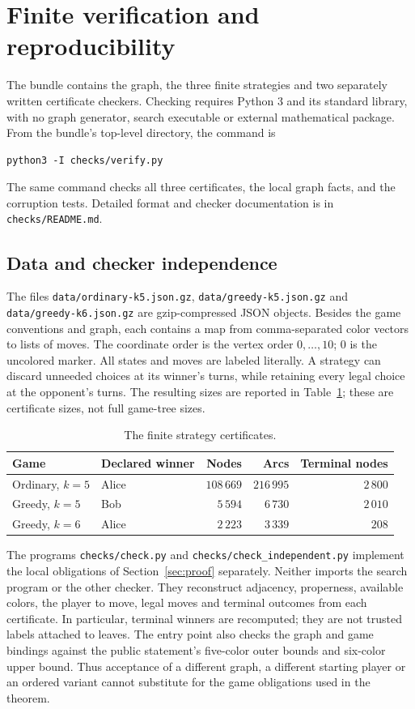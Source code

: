 \documentclass[11pt]{article}
\begin{document}
\section{Finite verification and reproducibility}\label{sec:checking}
The bundle contains the graph, the three finite strategies and two
separately written certificate checkers. Checking requires Python 3
and its standard library, with no graph generator, search executable
or external mathematical package. From the bundle's top-level directory,
the command is
\begin{verbatim}
python3 -I checks/verify.py
\end{verbatim}
The same command checks all three certificates, the local graph facts,
and the corruption tests. Detailed format and checker documentation is in
\texttt{checks/README.md}.

\subsection{Data and checker independence}
The files \texttt{data/ordinary-k5.json.gz},
\texttt{data/greedy-k5.json.gz} and \texttt{data/greedy-k6.json.gz}
are gzip-compressed JSON objects.
Besides the game conventions and graph, each contains a map from
comma-separated color vectors to lists of moves. The coordinate order
is the vertex order $0,\ldots,10$; $0$ is the uncolored marker.
All states and moves are labeled literally. A strategy can discard
unneeded choices at its winner's turns, while retaining every legal
choice at the opponent's turns. The resulting sizes are reported in
Table~\ref{tab:certificates}; these are certificate sizes, not full
game-tree sizes.

\begin{table}[ht]
\centering
\begin{tabular}{llrrr}
\toprule
Game & Declared winner & Nodes & Arcs & Terminal nodes\\
\midrule
Ordinary, $k=5$ & Alice & $108\,669$ & $216\,995$ & $2\,800$\\
Greedy, $k=5$ & Bob & $5\,594$ & $6\,730$ & $2\,010$\\
Greedy, $k=6$ & Alice & $2\,223$ & $3\,339$ & $208$\\
\bottomrule
\end{tabular}
\caption{The finite strategy certificates.}
\label{tab:certificates}
\end{table}

The programs \texttt{checks/check.py} and
\texttt{checks/check\_independent.py} implement the local obligations
of Section~\ref{sec:proof} separately. Neither imports the search
program or the other checker. They reconstruct adjacency, properness,
available colors, the player to move, legal moves and terminal outcomes
from each certificate. In particular, terminal winners are recomputed;
they are not trusted labels attached to leaves. The entry point also
checks the graph and game bindings against the public statement's
five-color outer bounds and six-color upper bound. Thus acceptance of a different graph, a
different starting player or an ordered variant cannot substitute for
the game obligations used in the theorem.
\end{document}

